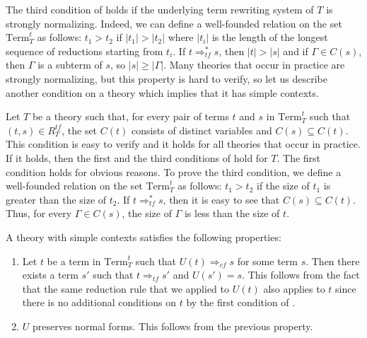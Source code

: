\documentclass[reqno]{amsart}
\theoremstyle{definition}
\theoremstyle{remark}
\newcommand{\Term}{\mathrm{Term}}
\numberwithin{figure}{section}
\begin{document}
The third condition of  holds if the underlying term rewriting system of $T$ is strongly normalizing.
Indeed, we can define a well-founded relation on the set $\Term_T^t$ as follows: $t_1 > t_2$ if $|t_1| > |t_2|$ where $|t_i|$ is the length of the longest sequence of reductions starting from $t_i$.
If $t \Rightarrow_{tf}^* s$, then $|t| > |s|$ and if $\Gamma \in C(s)$, then $\Gamma$ is a subterm of $s$, so $|s| \geq |\Gamma|$.
Many theories that occur in practice are strongly normalizing, but this property is hard to verify, so let us describe another condition on a theory which implies that it has simple contexts.

Let $T$ be a theory such that, for every pair of terms $t$ and $s$ in $\Term_T^t$ such that $(t,s) \in R^{tf}_T$, the set $C(t)$ consists of distinct variables and $C(s) \subseteq C(t)$.
This condition is easy to verify and it holds for all theories that occur in practice.
If it holds, then the first and the third conditions of  hold for $T$.
The first condition holds for obvious reasons.
To prove the third condition, we define a well-founded relation on the set $\Term_T^t$ as follows: $t_1 > t_2$ if the size of $t_1$ is greater than the size of $t_2$.
If $t \Rightarrow_{tf}^* s$, then it is easy to see that $C(s) \subseteq C(t)$.
Thus, for every $\Gamma \in C(s)$, the size of $\Gamma$ is less than the size of $t$.

A theory with simple contexts satisfies the following properties:
\begin{enumerate}
\item \label{it:red-fib} Let $t$ be a term in $\Term_T^t$ such that $U(t) \Rightarrow_{cf} s$ for some term $s$.
Then there exists a term $s'$ such that $t \Rightarrow_{tf} s'$ and $U(s') = s$.
This follows from the fact that the same reduction rule that we applied to $U(t)$ also applies to $t$ since there is no additional conditions on $t$ by the first condition of .
\item \label{it:red-nf} $U$ preserves normal forms. This follows from the previous property.
\end{enumerate}
\end{document}
